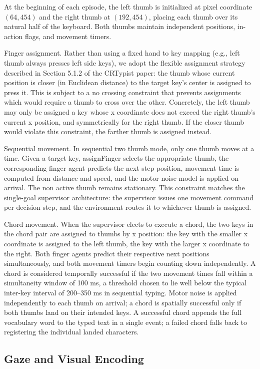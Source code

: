 \documentclass[sigconf,review,anonymous]{acmart}
\begin{document}
At the beginning of each episode, the left thumb is initialized at pixel coordinate $(64, 454)$ and the right thumb at $(192, 454)$, placing each thumb over its natural half of the keyboard. Both thumbs maintain independent positions, in-action flags, and movement timers.

Finger assignment. Rather than using a fixed hand to key mapping (e.g., left thumb always presses left side keys), we adopt the flexible assignment strategy described in Section 5.1.2 of the CRTypist paper: the thumb whose current position is closer (in Euclidean distance) to the target key's center is assigned to press it. This is subject to a no crossing constraint that prevents assignments which would require a thumb to cross over the other. Concretely, the left thumb may only be assigned a key whose x coordinate does not exceed the right thumb's current x position, and symmetrically for the right thumb. If the closer thumb would violate this constraint, the farther thumb is assigned instead.

Sequential movement. In sequential two thumb mode, only one thumb moves at a time. Given a target key, assignFinger selects the appropriate thumb, the corresponding finger agent predicts the next step position, movement time is computed from distance and speed, and the motor noise model is applied on arrival. The non active thumb remains stationary. This constraint matches the single-goal supervisor architecture: the supervisor issues one movement command per decision step, and the environment routes it to whichever thumb is assigned.

Chord movement. When the supervisor elects to execute a chord, the two keys in the chord pair are assigned to thumbs by x position: the key with the smaller x coordinate is assigned to the left thumb, the key with the larger x coordinate to the right. Both finger agents predict their respective next positions simultaneously, and both movement timers begin counting down independently. A chord is considered temporally successful if the two movement times fall within a simultaneity window of 100 ms, a threshold chosen to lie well below the typical inter-key interval of 200–350 ms in sequential typing. Motor noise is applied independently to each thumb on arrival; a chord is spatially successful only if both thumbs land on their intended keys. A successful chord appends the full vocabulary word to the typed text in a single event; a failed chord falls back to registering the individual landed characters.

\subsection{Gaze and Visual Encoding}
\label{sec:gaze}
\end{document}
